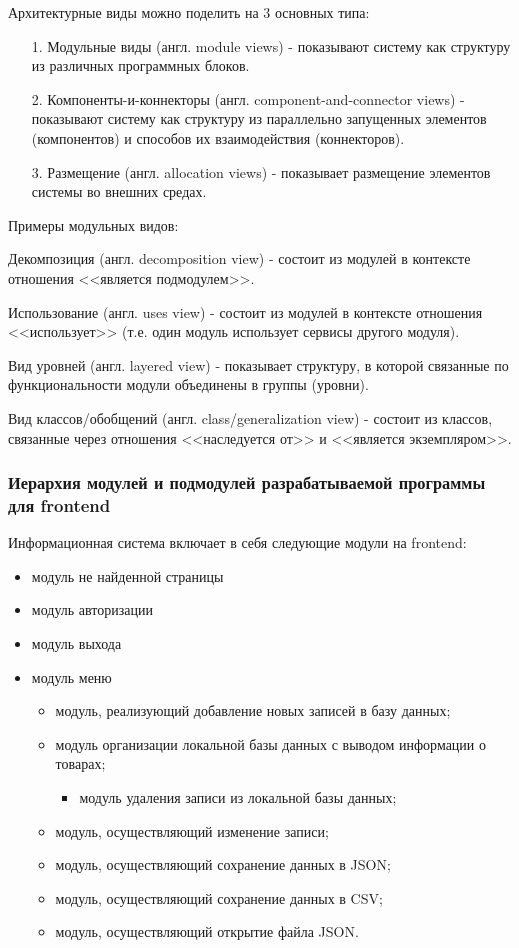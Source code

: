 Архитектурные виды можно поделить на 3 основных типа:

\begin{itemize}
    \item [1.] Модульные виды (англ. module views) - показывают систему как структуру
    из различных программных блоков.
    \item [2.] Компоненты-и-коннекторы (англ. component-and-connector views) - показывают
    систему как структуру из параллельно запущенных элементов (компонентов)
    и способов их взаимодействия (коннекторов).
    \item [3.] Размещение (англ. allocation views) - показывает размещение
    элементов системы во внешних средах.
\end{itemize}

Примеры модульных видов:

Декомпозиция (англ. decomposition view) - состоит из модулей в контексте
отношения <<является подмодулем>>.

Использование (англ. uses view) - состоит из модулей в контексте
отношения <<использует>> (т.е. один модуль использует сервисы другого модуля).

Вид уровней (англ. layered view) - показывает структуру,
в которой связанные по функциональности модули объединены в группы (уровни).

Вид классов/обобщений (англ. class/generalization view) - состоит из классов,
связанные через отношения <<наследуется от>> и <<является экземпляром>>.

\subsubsection*{Иерархия модулей и подмодулей разрабатываемой программы для frontend}

Информационная система включает в себя следующие модули на frontend:

\begin{itemize}
    \item модуль не найденной страницы
    \item модуль авторизации
    \item модуль выхода
    \item модуль меню
    \begin{itemize}
        \item модуль, реализующий добавление новых записей в базу данных;
        \item модуль организации локальной базы данных с выводом информации о товарах;
        \begin{itemize}
            \item модуль удаления записи из локальной базы данных;
        \end{itemize}
        \item модуль, осуществляющий изменение записи;
        \item модуль, осуществляющий сохранение данных в JSON;
        \item модуль, осуществляющий сохранение данных в CSV;
        \item модуль, осуществляющий открытие файла JSON.
    \end{itemize}
\end{itemize}

